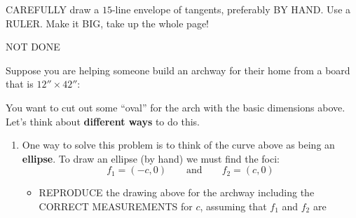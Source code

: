 \documentclass[noauthor,nooutcomes,hints,handout]{ximera}
\begin{document}
\mynewpage






\begin{question}
  CAREFULLY draw a $15$-line envelope of tangents, preferably BY
  HAND. Use a RULER. Make it BIG, take up the whole page!
  \begin{freeResponse}
    NOT DONE
  \end{freeResponse}
\end{question}
\mynewpage





\begin{question}
  Suppose you are helping someone build an archway for their home from
  a board that is $12''\times 42''$:
  \begin{center}
  \end{center}
  You want to cut out some ``oval'' for the arch with the basic
  dimensions above. Let's think about \textbf{different ways} to do
  this.
  \begin{enumerate}
  \item One way to solve this problem is to think of the curve above
    as being an \textbf{ellipse}. To draw an ellipse (by hand) we must
    find the foci:
    \[
    f_1 = (-c,0) \qquad \text{and} \qquad f_2 = (c,0)
    \]
    \begin{itemize}
    \item REPRODUCE the drawing above for the archway including the
      CORRECT MEASUREMENTS for $c$, assuming that $f_1$ and $f_2$ are

\end{itemize}
\end{enumerate}
\end{question}
\end{document}
